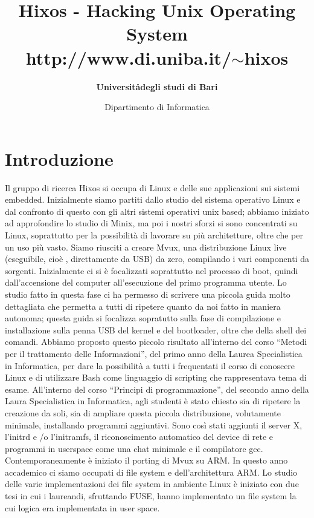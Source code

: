 \documentclass[a4paper,12pt]{article}
\title{\textbf{Hixos} - Hacking Unix Operating System\\http://www.di.uniba.it/$\sim$hixos}
\author{\textbf{Universit\aa degli studi di Bari}}
\date{Dipartimento di Informatica}
\newcommand{\ua }{\`{u} }
\renewcommand{\aa }{\`{a} }
\newcommand{\ea }{\`{e} }
\newcommand{\ia }{\`{i} }
\begin{document}
\maketitle

\section*{Introduzione}
Il gruppo di ricerca Hixos si occupa di Linux e delle sue applicazioni sui sistemi embedded.
Inizialmente siamo partiti dallo studio del sistema operativo Linux e dal confronto di questo con gli altri sistemi operativi unix based; abbiamo iniziato ad approfondire lo studio di Minix, ma poi i nostri sforzi si sono concentrati su Linux, soprattutto per la possibilità di lavorare su pi\ua architetture, oltre che per un uso pi\ua vasto.
Siamo riusciti a creare Mvux, una distribuzione Linux live (eseguibile, cio\ea, direttamente da USB) da zero, compilando i vari componenti da sorgenti.
Inizialmente ci si \ea focalizzati soprattutto nel processo di boot, quindi dall'accensione del computer all'esecuzione del primo programma utente.
Lo studio fatto in questa fase ci ha permesso di scrivere una piccola guida molto dettagliata che permetta a tutti di ripetere quanto da noi fatto in maniera autonoma; questa guida si focalizza sopratutto sulla fase di compilazione e installazione sulla penna USB del kernel e del bootloader, oltre che della shell dei comandi.
Abbiamo proposto questo piccolo risultato all'interno del corso ``Metodi per il trattamento delle Informazioni'', del primo anno della Laurea Specialistica in Informatica, per dare la possibilit\aa a tutti i frequentati il corso di conoscere Linux e di utilizzare Bash come linguaggio di scripting che rappresentava tema di esame.
All'interno del corso ``Principi di programmazione'', del secondo anno della Laura Specialistica in Informatica, agli studenti \ea stato chiesto sia di ripetere la creazione da soli, sia di ampliare questa piccola distribuzione, volutamente minimale, installando programmi aggiuntivi.
Sono cos\ia stati aggiunti il server X, l'initrd e \slash o l'initramfs, il riconoscimento automatico del device di rete e programmi in userspace come una chat minimale e il compilatore gcc.
Contemporaneamente \ea iniziato il porting di Mvux su ARM.
In questo anno accademico ci siamo occupati di file system e dell'architettura ARM.
Lo studio delle varie implementazioni dei file system in ambiente Linux è iniziato con due tesi in cui i laureandi, sfruttando FUSE, hanno implementato un file system la cui logica era implementata in user space.
\end{document}
